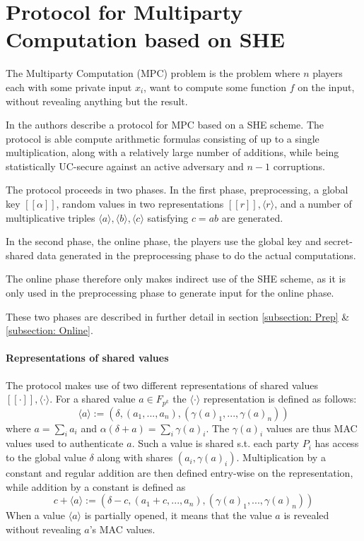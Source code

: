 \documentclass[../main.tex]{subfiles}
\begin{document}
\section{Protocol for Multiparty Computation based on SHE} \label{section: MPC scheme}
The Multiparty Computation (MPC) problem is the problem where $n$ players each with some private input $x_i$, want to compute some function $f$ on the input, without revealing anything but the result.

In \cite{damgaard2012multiparty} the authors describe a protocol for MPC based on a SHE scheme. The protocol is able compute arithmetic formulas consisting of up to a single multiplication, along with a relatively large number of additions, while being statistically UC-secure against an active adversary and $n - 1$ corruptions.

The protocol proceeds in two phases. In the first phase, preprocessing, a global key $[\![\alpha]\!]$, random values in two representations $[\![r]\!], \langle r \rangle$, and a number of multiplicative triples $\langle a \rangle, \langle b \rangle, \langle c \rangle$ satisfying $c = ab$ are generated.

In the second phase, the online phase, the players use the global key and secret-shared data generated in the preprocessing phase to do the actual computations.

The online phase therefore only makes indirect use of the SHE scheme, as it is only used in the preprocessing phase to generate input for the online phase.

These two phases are described in further detail in section \ref{subsection: Prep} \& \ref{subsection: Online}.

\paragraph{Representations of shared values}
The protocol makes use of two different representations of shared values $[\![ \cdot ]\!], \langle \cdot \rangle$. For a shared value $a \in F_{p^k}$ the $\langle \cdot \rangle$ representation is defined as follows:
$$\langle a \rangle := (\delta, (a_1, ..., a_n), (\gamma(a)_1, ..., \gamma(a)_n))$$
where $a = \sum_i a_i$ and $\alpha (\delta + a) = \sum_i \gamma(a)_i$. The $\gamma(a)_i$ values are thus MAC values used to authenticate $a$. Such a value is shared s.t. each party $P_i$ has access to the global value $\delta$ along with shares $(a_i, \gamma(a)_i)$. Multiplication by a constant and regular addition are then defined entry-wise on the representation, while addition by a constant is defined as $$c + \langle a \rangle := (\delta - c, (a_1 + c, ..., a_n), (\gamma(a)_1, ..., \gamma(a)_n))$$
When a value $\langle a \rangle$ is partially opened, it means that the value $a$ is revealed without revealing $a$'s MAC values.
\end{document}
